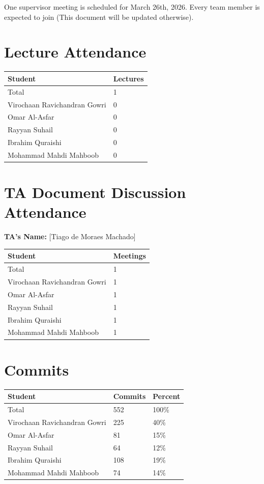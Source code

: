 \documentclass{article}
\begin{document}
One supervisor meeting is scheduled for March 26th, 2026. Every team member is expected to join (This document will be updated otherwise).

\section{Lecture Attendance}


\begin{table}[H]
\centering
\begin{tabular}{ll}
\toprule
\textbf{Student} & \textbf{Lectures}\\
\midrule
Total & 1\\
Virochaan Ravichandran Gowri & 0\\
Omar Al-Asfar & 0\\
Rayyan Suhail & 0\\
Ibrahim Quraishi & 0\\
Mohammad Mahdi Mahboob & 0\\
\bottomrule
\end{tabular}
\end{table}

\section{TA Document Discussion Attendance}

\noindent \textbf{TA's Name: } [Tiago de Moraes Machado]

\begin{table}[H]
\centering
\begin{tabular}{ll}
\toprule
\textbf{Student} & \textbf{Meetings}\\
\midrule
Total & 1\\
Virochaan Ravichandran Gowri & 1\\
Omar Al-Asfar & 1\\
Rayyan Suhail & 1\\
Ibrahim Quraishi & 1\\
Mohammad Mahdi Mahboob & 1\\
\bottomrule
\end{tabular}
\end{table}

\section{Commits}

\begin{table}[H]
\centering
\begin{tabular}{lll}
\toprule
\textbf{Student} & \textbf{Commits} & \textbf{Percent}\\
\midrule
Total & 552 & 100\% \\
Virochaan Ravichandran Gowri & 225 & 40\% \\
Omar Al-Asfar & 81 & 15\% \\
Rayyan Suhail & 64 & 12\% \\
Ibrahim Quraishi & 108 & 19\% \\
Mohammad Mahdi Mahboob & 74 & 14\% \\
\bottomrule
\end{tabular}
\end{table}
\end{document}
